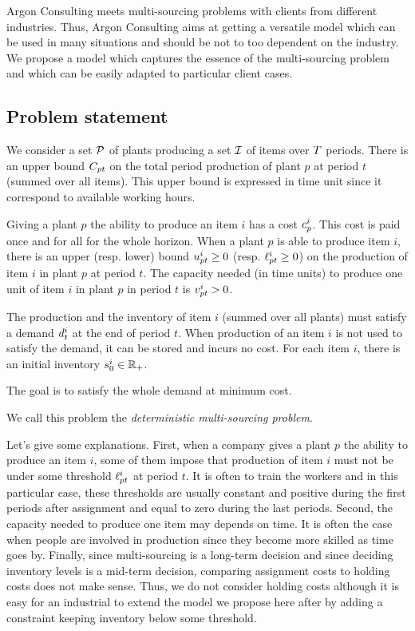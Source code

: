 Argon Consulting meets multi-sourcing problems with clients from different industries.
Thus, Argon Consulting aims at getting a versatile model which can be used in many situations and should be not to too dependent on the industry.
We propose a model which captures the essence of the multi-sourcing problem and which can be easily adapted to particular client cases.


\subsection{Problem statement}
\label{sec:multi-sourcing:deterministic:introduction:problem_statement}


We consider a set $\mathcal{P}$ of plants producing a set $\mathcal{I}$ of items over $T$ periods.
There is an upper bound $C_{pt}$ on the total period production of plant $p$ at period $t$ (summed over all items).
This upper bound is expressed in time unit since it correspond to available working hours.


Giving a plant $p$ the ability to produce an item $i$ has a cost $c_p^i$.
This cost is paid once and for all for the whole horizon.
When a plant $p$ is able to produce item $i$, there is an upper (resp. lower) bound $u_{pt}^i\ge 0$ (resp. $\ell_{pt}^i\ge 0$) on the production of item $i$ in plant $p$ at period $t$.
The capacity needed (in time units) to produce one unit of item $i$ in plant $p$ in period $t$ is $v_{pt}^i>0$.


The production and the inventory of item $i$ (summed over all plants) must satisfy a demand $d_t^i$ at the end of period $t$.
When production of an item $i$ is not used to satisfy the demand, it can be stored and incurs no cost.
For each item $i$, there is an initial inventory $s_0^i\in\mathbb{R}_+$.


The goal is to satisfy the whole demand at minimum cost.


We call this problem the \emph{deterministic multi-sourcing problem}.


\medskip


Let's give some explanations.
First, when a company gives a plant $p$ the ability to produce an item $i$, some of them impose that production of item $i$ must not be under some threshold $\ell_{pt}^i$ at period $t$.
It is often to train the workers and in this particular case, these thresholds are usually constant and positive during the first periods after assignment and equal to zero during the last periods.
Second, the capacity needed to produce one item may depends on time.
It is often the case when people are involved in production since they become more skilled as time goes by.
Finally, since multi-sourcing is a long-term decision and since deciding inventory levels is a mid-term decision, comparing assignment costs to holding costs does not make sense.
Thus, we do not consider holding costs although it is easy for an industrial to extend the model we propose here after by adding a constraint keeping inventory below some threshold.


